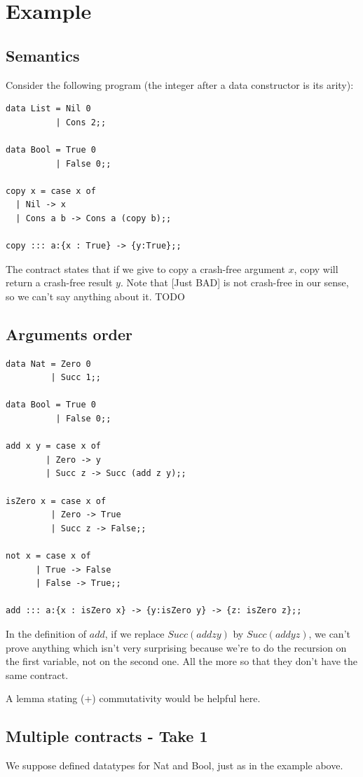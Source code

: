 \documentclass{article}
\begin{document}
\section{Example}


\subsection{Semantics}
Consider the following program (the integer after a data constructor is its arity):
\begin{verbatim}
data List = Nil 0
          | Cons 2;;

data Bool = True 0
          | False 0;;

copy x = case x of
  | Nil -> x
  | Cons a b -> Cons a (copy b);;

copy ::: a:{x : True} -> {y:True};;
\end{verbatim}
The contract states that if we give to copy a crash-free argument $x$, copy will return a crash-free result $y$.
Note that [Just BAD] is not crash-free in our sense, so we can't say anything about it. TODO


\subsection{Arguments order}
\begin{verbatim}
data Nat = Zero 0
         | Succ 1;;

data Bool = True 0
          | False 0;;

add x y = case x of
        | Zero -> y
        | Succ z -> Succ (add z y);;

isZero x = case x of
         | Zero -> True
         | Succ z -> False;;

not x = case x of
      | True -> False
      | False -> True;;

add ::: a:{x : isZero x} -> {y:isZero y} -> {z: isZero z};;
\end{verbatim}

In the definition of $add$, if we replace $Succ (add z y)$ by $Succ (add y z)$, we can't prove anything which isn't very surprising because we're to do the recursion on the first variable, not on the second one. All the more so that they don't have the same contract.

A lemma stating (+) commutativity would be helpful here.


\subsection{Multiple contracts - Take 1}
We suppose defined datatypes for Nat and Bool, just as in the example above.
\end{document}
